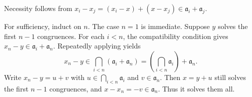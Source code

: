 Necessity follows from $x_i-x_j=(x_i-x)+(x-x_j)\in\mathfrak a_i+\mathfrak a_j$.

For sufficiency, induct on $n$. The case $n=1$ is immediate. Suppose $y$ solves the first $n-1$ congruences. For each $i<n$, the compatibility condition gives $x_n-y\in\mathfrak a_i+\mathfrak a_n$. Repeatedly applying  yields
\[x_n-y\in\bigcap_{i<n}(\mathfrak a_i+\mathfrak a_n)=\left(\bigcap_{i<n}\mathfrak a_i\right)+\mathfrak a_n.\]
Write $x_n-y=u+v$ with $u\in\bigcap_{i<n}\mathfrak a_i$ and $v\in\mathfrak a_n$. Then $x=y+u$ still solves the first $n-1$ congruences, and $x-x_n=-v\in\mathfrak a_n$. Thus it solves them all.
